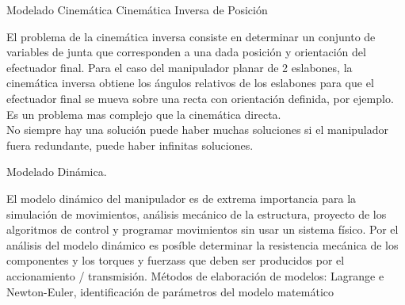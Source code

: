 \documentclass[12pt,letterpaper]{report}
\begin{document}
\begin{center}
\begin{flushleft}
\begin{center}
\begin{flushleft}
\begin{flushleft}
\begin{center}
\begin{flushleft}
\begin{flushleft}
 Modelado Cinemática Cinemática Inversa de Posición
 \begin{flushleft}
 El problema de la cinemática inversa consiste en determinar un conjunto de variables de junta que corresponden a una dada posición y orientación del efectuador final. Para el caso del manipulador planar de 2 eslabones, la cinemática inversa obtiene los ángulos relativos de los eslabones para que el efectuador final se mueva sobre una recta con orientación definida, por ejemplo. Es un problema mas complejo que la cinemática directa.\\
  No siempre hay una solución puede haber muchas soluciones si el manipulador fuera redundante, puede haber infinitas soluciones.
  \begin{flushleft}
  Modelado Dinámica.
  \begin{flushleft}
  El modelo dinámico del manipulador es de extrema importancia para la simulación de movimientos, análisis mecánico de la estructura, proyecto de los algoritmos de control y programar movimientos sin usar un sistema físico. Por el análisis del modelo dinámico es posíble determinar la resistencia mecánica de los componentes y los torques y fuerzass que deben ser producidos por el accionamiento / transmisión. Métodos de elaboración de modelos: Lagrange e Newton-Euler, identificación de parámetros del modelo matemático
  \end{flushleft}
  \end{flushleft}
 \end{flushleft}
 \end{flushleft}
\end{flushleft}
\end{center}
\end{flushleft}
\end{flushleft}
\end{center}
\end{flushleft}
\end{center}
\end{document}
